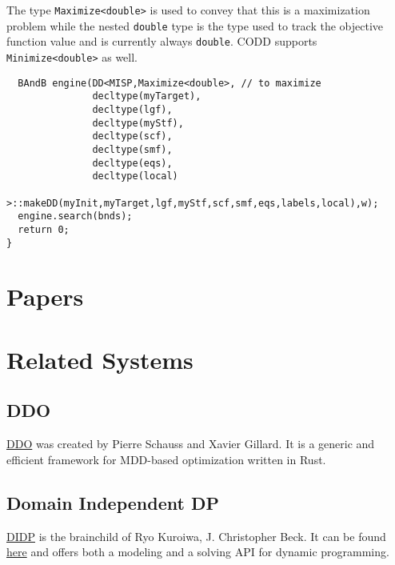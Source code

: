 \documentclass[11pt]{article}
\begin{document}
\begin{enumerate}
\begin{hint}
The type \texttt{Maximize<double>} is used to convey that this is a maximization problem
while the nested \texttt{double} type is the type used to track the objective function value and is currently always \texttt{double}. CODD supports \texttt{Minimize<double>} as well.
\end{hint}

\begin{verbatim}
  BAndB engine(DD<MISP,Maximize<double>, // to maximize
               decltype(myTarget), 
               decltype(lgf),
               decltype(myStf),
               decltype(scf),
               decltype(smf),
               decltype(eqs),
               decltype(local)
               >::makeDD(myInit,myTarget,lgf,myStf,scf,smf,eqs,labels,local),w);
  engine.search(bnds);
  return 0;
}
\end{verbatim}
\end{enumerate}


\section{Papers}
\label{sec:orga39967d}

\section{Related Systems}
\label{sec:orgb7a58e4}
\subsection{DDO}
\label{sec:org0dd444c}
\href{https://github.com/xgillard/ddo}{DDO} was created by Pierre Schauss and Xavier Gillard.
It is a generic and efficient framework for MDD-based optimization written in Rust.

\subsection{Domain Independent DP}
\label{sec:org7eab4db}
\href{https://arxiv.org/abs/2401.13883}{DIDP} is the brainchild of Ryo Kuroiwa, J. Christopher Beck. It can be found \href{https://didp.ai}{here} and offers
both a modeling and a solving API for dynamic programming. 
\end{document}
